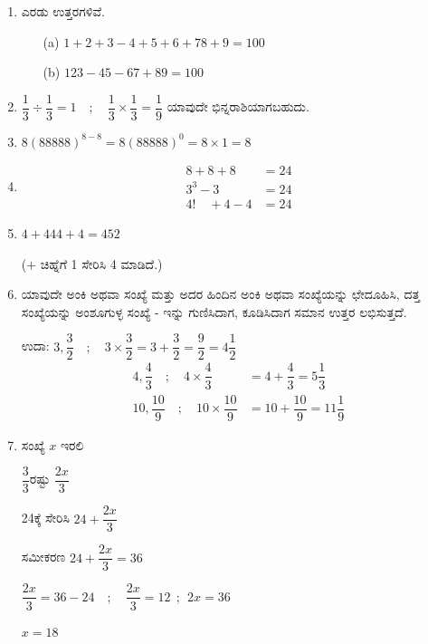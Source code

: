 \begin{enumerate}
\itemsep=5pt

\item ಎರಡು ಉತ್ತರಗಳಿವೆ. 
\begin{itemize}
\item[(a)] $1 + 2 + 3 - 4 + 5 + 6 +78 + 9 = 100$
\item[(b)] $123 - 45 - 67 + 89 = 100$
\end{itemize}

\item $\dfrac{1}{3} \div \dfrac{1}{3} = 1\quad;\quad \dfrac{1}{3} \times \dfrac{1}{3} = \dfrac{1}{9}$ ಯಾವುದೇ ಭಿನ್ನರಾಶಿಯಾಗಬಹುದು. 

\item $8(88888)^{8-8} = 8(88888)^{0} = 8\times 1 = 8$

\item 
\begin{align*}
8 + 8 + 8 & = 24\\
3^{3} - 3 & = 24\\
4!\quad +4 - 4 & = 24
\end{align*}

\item  $4 + 444 + 4 = 452$

($+$ ಚಿಹ್ನೆಗೆ 1 ಸೇರಿಸಿ 4 ಮಾಡಿದೆ.)

\item ಯಾವುದೇ ಅಂಕಿ ಅಥವಾ ಸಂಖ್ಯೆ ಮತ್ತು ಅದರ ಹಿಂದಿನ ಅಂಕಿ ಅಥವಾ ಸಂಖ್ಯೆಯನ್ನು ಛೇದೂಹಿಸಿ, ದತ್ತ ಸಂಖ್ಯೆಯನ್ನು ಅಂಶೂಗುಳ್ಳ ಸಂಖ್ಯೆ - ಇನ್ನು ಗುಣಿಸಿದಾಗ, ಕೂಡಿಸಿದಾಗ ಸಮಾನ ಉತ್ತರ ಲಭಿಸುತ್ತದೆ. 

ಉದಾ: $3, \dfrac{3}{2} \quad;\quad 3 \times \dfrac{3}{2} = 3 + \dfrac{3}{2} = \dfrac{9}{2} = 4\dfrac{1}{2}$
\begin{align*}
4, \dfrac{4}{3} \quad;\quad 4\times \dfrac{4}{3} & = 4 + \dfrac{4}{3} = 5\dfrac{1}{3}\\
10, \dfrac{10}{9} \quad;\quad 10\times \dfrac{10}{9} & = 10 + \dfrac{10}{9} = 11\dfrac{1}{9}
\end{align*}

\item ಸಂಖ್ಯೆ $x$ ಇರಲಿ 

\vskip 0.1cm
$\dfrac{3}{3}$ರಷ್ಟು $\dfrac{2x}{3}$

\vskip 0.1cm
24ಕ್ಕೆ ಸೇರಿಸಿ $24 + \dfrac{2x}{3}$

\vskip 0.1cm
ಸಮೀಕರಣ $24 + \dfrac{2x}{3} = 36$

\vskip 0.1cm
$\dfrac{2x}{3} = 36 - 24 \quad;\quad \dfrac{2x}{3} =12 ~~;~~ 2x = 36$

\vskip 0.1cm
$x = 18$


\end{enumerate}
